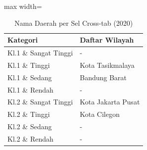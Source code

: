 \begin{table}[H]
\centering
\caption{Nama Daerah per Sel Cross-tab (2020)} \label{tab:crossname2020}
\begin{adjustbox}{max width=\textwidth}
\begin{tabular}{|p{4cm}|p{10cm}|}
\hline
\textbf{Kategori} & \textbf{Daftar Wilayah} \\
\hline
Kl.1 \& Sangat Tinggi & - \\
\hline
Kl.1 \& Tinggi & Kota Tasikmalaya \\
\hline
Kl.1 \& Sedang & Bandung Barat \\
\hline
Kl.1 \& Rendah & - \\
\hline
Kl.2 \& Sangat Tinggi & Kota Jakarta Pusat \\
\hline
Kl.2 \& Tinggi & Kota Cilegon \\
\hline
Kl.2 \& Sedang & - \\
\hline
Kl.2 \& Rendah & - \\
\hline
\end{tabular}
\end{adjustbox}
\end{table}